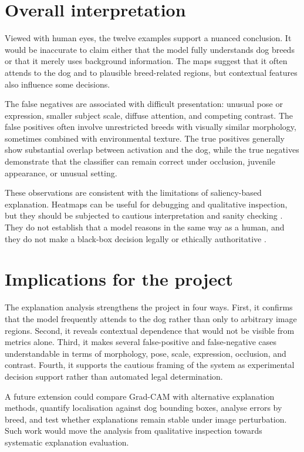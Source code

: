 \section{Overall interpretation}

Viewed with human eyes, the twelve examples support a nuanced conclusion. It would be inaccurate to claim either that the model fully understands dog breeds or that it merely uses background information. The maps suggest that it often attends to the dog and to plausible breed-related regions, but contextual features also influence some decisions.

The false negatives are associated with difficult presentation: unusual pose or expression, smaller subject scale, diffuse attention, and competing contrast. The false positives often involve unrestricted breeds with visually similar morphology, sometimes combined with environmental texture. The true positives generally show substantial overlap between activation and the dog, while the true negatives demonstrate that the classifier can remain correct under occlusion, juvenile appearance, or unusual setting.

These observations are consistent with the limitations of saliency-based explanation. Heatmaps can be useful for debugging and qualitative inspection, but they should be subjected to cautious interpretation and sanity checking \citep{adebayo2018sanity}. They do not establish that a model reasons in the same way as a human, and they do not make a black-box decision legally or ethically authoritative \citep{rudin2019stop}.

\section{Implications for the project}

The explanation analysis strengthens the project in four ways. First, it confirms that the model frequently attends to the dog rather than only to arbitrary image regions. Second, it reveals contextual dependence that would not be visible from metrics alone. Third, it makes several false-positive and false-negative cases understandable in terms of morphology, pose, scale, expression, occlusion, and contrast. Fourth, it supports the cautious framing of the system as experimental decision support rather than automated legal determination.

A future extension could compare Grad-CAM with alternative explanation methods, quantify localisation against dog bounding boxes, analyse errors by breed, and test whether explanations remain stable under image perturbation. Such work would move the analysis from qualitative inspection towards systematic explanation evaluation.

